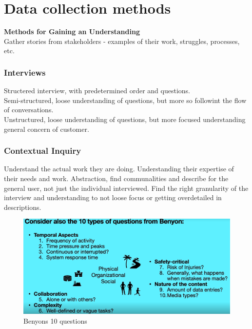 \chapter{Data collection methods}\label{chp:data_collection}
{\large \textbf{Methods for Gaining an Understanding}}\\
Gather stories from stakeholders - examples of their work, struggles, processes, etc.

\subsection*{Interviews}
Structered interview, with predetermined order and questions.\\
Semi-structured, loose understanding of questions, but more so followint the flow of conversations.\\
Unstructured, loose understanding of questions, but more focused understanding general concern of customer.

\subsection*{Contextual Inquiry}
Understand the actual work they are doing. Understanding their expertise of their needs and work. Abstraction, find communalities and describe for the general user, not just the individual interviewed. Find the right granularity of the interview and understanding to not loose focus or getting overdetailed in descriptions.

\begin{figure}[H]
    \begin{center}
        \includegraphics*[width=\linewidth*3/4]{chapters/data_collection/figures/benyon.png}        
    \end{center}
    \caption{Benyons 10 questions}
    \label{fig:benyon}
\end{figure}

